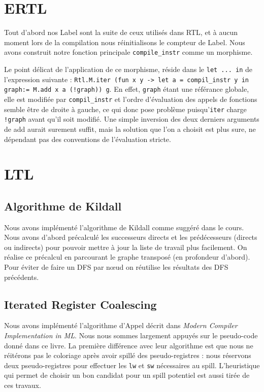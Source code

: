 \documentclass[a4paper]{article}
\begin{document}
\section{ERTL}

Tout d'abord nos Label sont la suite de ceux utilisés dans RTL, et à
aucun moment lors de la compilation nous réinitialisons le compteur de
Label. Nous avons construit notre fonction principale
\texttt{compile\_instr} comme un morphisme.

Le point délicat de l'application de ce morphisme, réside dans le \texttt{let ... in} de l'expression suivante :
\texttt{Rtl.M.iter (fun x y -> let a = compil\_instr y in graph:= M.add
x a (!graph)) g}. En effet, \texttt{graph} étant une référance globale, elle est
modifiée par \texttt{compil\_instr} et l'ordre d'évaluation des appels
de fonctions semble être de droite à gauche, ce qui donc pose problème
puisqu'\texttt{iter} charge \texttt{!graph} avant qu'il soit modifié. Une simple inversion des
deux derniers arguments de add aurait surement suffit, mais la solution que l'on a choisit est
plus sure, ne dépendant pas des conventions de l'évaluation stricte.
\section{LTL}
\subsection{Algorithme de Kildall}

Nous avons implémenté l'algorithme de Kildall comme suggéré dans le cours. Nous avons d'abord précalculé
les successeurs directs et les prédécesseurs (directs ou indirects) pour pouvoir mettre à jour la liste de
travail plus facilement. On réalise ce précalcul en parcourant le graphe transposé (en profondeur d'abord).
Pour éviter de faire un DFS par nœud on réutilise les résultats des DFS précédents.

\subsection{Iterated Register Coalescing}

Nous avons implémenté l'algorithme d'Appel décrit dans \emph{Modern Compiler Implementation in ML}.
Nous nous sommes largement appuyés sur le pseudo-code donné dans ce livre. La première différence avec
leur algorithme est que nous ne réitérons pas le coloriage après avoir spillé des pseudo-registres :
nous réservons deux pseudo-registres pour effectuer les \texttt{lw} et \texttt{sw} nécessaires au spill.
L'heuristique qui permet de choisir un bon candidat pour un spill potentiel est aussi tirée de ces travaux.
\end{document}
